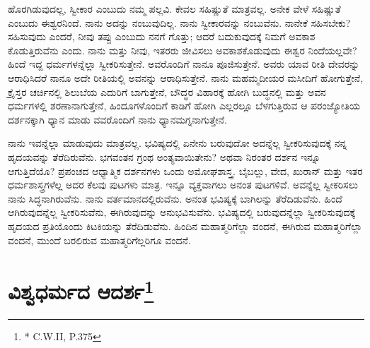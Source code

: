 ಹೊರಗಿಡುವುದಲ್ಲ, ಸ್ವೀಕಾರ ಎಂಬುದು ನಮ್ಮ ಪಲ್ಲವಿ. ಕೇವಲ ಸಹಿಷ್ಣುತೆ ಮಾತ್ರವಲ್ಲ. ಅನೇಕ ವೇಳೆ ಸಹಿಷ್ಣುತೆ ಎಂಬುದು ಈಶ್ವರನಿಂದೆ. ನಾನು ಅದನ್ನು ನಂಬುವುದಿಲ್ಲ. ನಾನು ಸ್ವೀಕಾರವನ್ನು ನಂಬುವೆನು. ನಾನೇಕೆ ಸಹಿಸಬೇಕು? ಸಹಿಸುವುದು ಎಂದರೆ, ನೀವು ತಪ್ಪು ಎಂಬುದು ನನಗೆ ಗೊತ್ತು; ಆದರೆ ಬದುಕುವುದಕ್ಕೆ ನಿಮಗೆ ಅವಕಾಶ ಕೊಡುತ್ತಿರುವೆನು ಎಂದು. ನಾನು ಮತ್ತು ನೀವು, ಇತರರು ಜೀವಿಸಲು ಅವಕಾಶಕೊಡುವುದು ಈಶ್ವರ ನಿಂದೆಯಲ್ಲವೇ? ಹಿಂದೆ ಇದ್ದ ಧರ್ಮಗಳನ್ನೆಲ್ಲಾ ಸ್ವೀಕರಿಸುತ್ತೇನೆ. ಅವರೊಂದಿಗೆ ನಾನೂ ಪೂಜಿಸುತ್ತೇನೆ. ಅವರು ಯಾವ ರೀತಿ ದೇವರನ್ನು ಆರಾಧಿಸಿದರೆ ನಾನೂ ಅದೇ ರೀತಿಯಲ್ಲಿ ಅವನನ್ನು ಆರಾಧಿಸುತ್ತೇನೆ. ನಾನು ಮಹಮ್ಮದೀಯರ ಮಸೀದಿಗೆ ಹೋಗುತ್ತೇನೆ, ಕ್ರೈಸ್ತರ ಚರ್ಚಿನಲ್ಲಿ ಶಿಲುಬೆಯ ಎದುರಿಗೆ ಬಾಗುತ್ತೇನೆ, ಬೌದ್ಧರ ವಿಹಾರಕ್ಕೆ ಹೋಗಿ ಬುದ್ಧನಲ್ಲಿ ಮತ್ತು ಅವನ ಧರ್ಮಗಳಲ್ಲಿ ಶರಣಾನಾಗುತ್ತೇನೆ, ಹಿಂದೂಗಳೊಂದಿಗೆ ಕಾಡಿಗೆ ಹೋಗಿ ಎಲ್ಲರಲ್ಲೂ ಬೆಳಗುತ್ತಿರುವ ಆ ಪರಂಜ್ಯೋತಿಯ ದರ್ಶನಕ್ಕಾಗಿ ಧ್ಯಾನ ಮಾಡು ವವರೊಂದಿಗೆ ನಾನು ಧ್ಯಾನಮಗ್ನನಾಗುತ್ತೇನೆ.

\newpage

ನಾನು ಇವನ್ನೆಲ್ಲಾ ಮಾಡುವುದು ಮಾತ್ರವಲ್ಲ. ಭವಿಷ್ಯದಲ್ಲಿ ಏನೇನು ಬರುವುದೋ ಅದನ್ನೆಲ್ಲ ಸ್ವೀಕರಿಸುವುದಕ್ಕೆ ನನ್ನ ಹೃದಯವನ್ನು ತೆರೆದಿರುವೆನು. ಭಗವಂತನ ಗ್ರಂಥ ಅಂತ್ಯವಾಯಿತೇನು? ಅಥವಾ ನಿರಂತರ ದರ್ಶನ ಇನ್ನೂ ಆಗುತ್ತಿದೆಯೊ? ಪ್ರಪಂಚದ ಆಧ್ಯಾತ್ಮಿಕ ದರ್ಶನಗಳು ಒಂದು ಅಮೋಘಶಾಸ್ತ್ರ. ಬೈಬಲ್ಲು, ವೇದ, ಖುರಾನ್​ ಮತ್ತು ಇತರ ಧರ್ಮಶಾಸ್ತ್ರಗಳೆಲ್ಲ ಅದರ ಕೆಲವು ಪುಟಗಳು ಮಾತ್ರ. ಇನ್ನೂ ವ್ಯಕ್ತವಾಗಲು ಅನಂತ ಪುಟಗಳಿವೆ. ಅವನ್ನೆಲ್ಲ ಸ್ವೀಕರಿಸಲು ನಾನು ಸಿದ್ಧನಾಗಿರುವೆನು. ನಾನು ವರ್ತಮಾನದಲ್ಲಿರುವೆನು. ಅನಂತ ಭವಿಷ್ಯಕ್ಕೆ ಬಾಗಿಲನ್ನು ತೆರೆದಿಡುವೆನು. ಹಿಂದೆ ಆಗಿರುವುದನ್ನೆಲ್ಲ ಸ್ವೀಕರಿಸುವೆನು, ಈಗಿರುವುದನ್ನು ಅನುಭವಿಸುವೆನು. ಭವಿಷ್ಯದಲ್ಲಿ ಬರುವುದನ್ನೆಲ್ಲಾ ಸ್ವೀಕರಿಸುವುದಕ್ಕೆ ಹೃದಯದ ಪ್ರತಿಯೊಂದು ಕಿಟಕಿಯನ್ನು ತೆರೆದಿಡುವೆನು. ಹಿಂದಿನ ಮಹಾತ್ಮರಿಗೆಲ್ಲಾ ವಂದನೆ, ಈಗಿರುವ ಮಹಾತ್ಮರಿಗೆಲ್ಲಾ ವಂದನೆ, ಮುಂದೆ ಬರಲಿರುವ ಮಹಾತ್ಮರಿಗೆಲ್ಲರಿಗೂ ವಂದನೆ.

\chapter{ವಿಶ್ವಧರ್ಮದ ಆದರ್ಶ\protect\footnote{* C.W.II, P.375}}%

